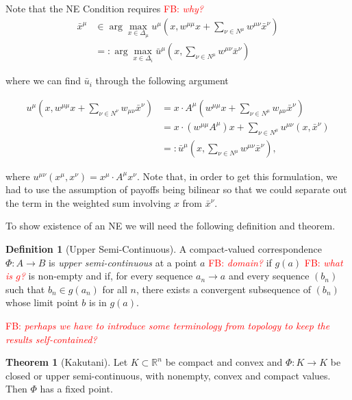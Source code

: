 \documentclass{article}
\theoremstyle{definition}
\newtheorem*{definition}{Definition}
\newtheorem{theorem}{Theorem}
\newcommand{\fb}[1]{\textcolor{red}{FB: \textit{#1}}}
\newcommand{\xmu}{x^{\mu}}
\newcommand{\NE}[1]{\bar{x}^{#1}}
\begin{document}
  Note that the NE Condition requires \fb{why?}
%
  \begin{align}
    \NE{\mu} &\in \arg\max_{x \in \Delta_\mu} u^\mu(x, w^{\mu \mu}x + \sum_{\nu \in N^\mu} w^{\mu \nu} \NE{\nu}) \nonumber \\
    & =: \arg\max_{x \in \Delta_i} \bar{u}^\mu(x, \sum_{\nu \in N^\mu} w^{\mu \nu} \NE{\nu})
  \end{align}

  where we can find $\bar{u}_i$ through the following argument
  
  \begin{align}
    u^\mu(x, w^{\mu \mu} x + \sum_{\nu \in N^\nu} w_{\mu \nu} \NE{\nu}) & = x \cdot A^\mu (w^{\mu \mu} x + \sum_{\nu \in N^\mu} w_{\mu \nu} \NE{\nu}) \\
     & = x \cdot (w^{\mu \mu} A^\mu)  x + \sum_{\nu \in N^\mu} u^{\mu \nu}(x, \NE{\nu}) \\
     & =: \bar{u}^\mu(x, \sum_{\nu \in N^\mu} w^{\mu \nu} \NE{\nu}), \nonumber
  \end{align}
  
  where $u^{\mu \nu}(\xmu, x^\nu) = \xmu \cdot A^\mu x^\nu$. Note
  that, in order to get this formulation, we had to use the assumption
  of payoffs being bilinear so that we could separate out the term in
  the weighted sum involving $x$ from $\bar{x}^\nu$.
  
  To show existence of an NE we will need the following definition and theorem.

  \begin{definition}[Upper Semi-Continuous]
    A compact-valued correspondence $\Phi: A \rightarrow B$ is
    \emph{upper semi-continuous} at a point $a$ \fb{domain?} if $g(a)$ \fb{what is $g$?} is non-empty
    and if, for every sequence $a_n \rightarrow a$ and every sequence
    $(b_n)$ such that $b_n \in g(a_n)$ for all $n$, there exists a
    convergent subsequence of $(b_n)$ whose limit point $b$ is in
    $g(a)$.
  \end{definition}

  \fb{perhaps we have to introduce some terminology from topology to keep the results self-contained?}

  \begin{theorem}[Kakutani]
    Let $K \subset \mathbb{R}^n$ be compact and convex and $\Phi: K \rightarrow K$ be closed or upper semi-continuous, with nonempty, convex and compact values. Then $\Phi$ has a fixed point.
  \end{theorem}
\end{document}
